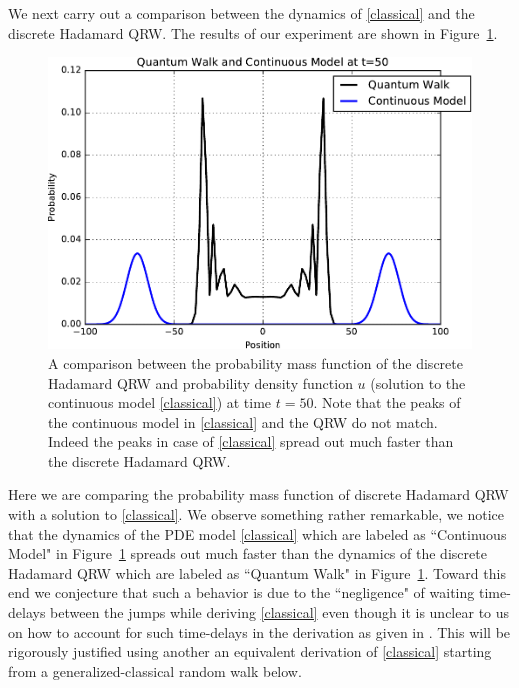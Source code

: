 \documentclass{siamart1116}
\begin{document}
We next carry out a comparison between the dynamics of \eqref{classical} and the 
discrete Hadamard QRW. The results of our experiment are shown in Figure~\ref{regplot}.
%
\begin{figure}[h!]
\centering
\includegraphics[width=.5\linewidth]{goldwateressay_fig2}
\caption{\footnotesize{A comparison between the probability mass function of the discrete 
Hadamard QRW and probability density function $u$ (solution to the continuous model 
\eqref{classical}) at time $t=50$. Note that the peaks of the continuous model in 
\eqref{classical} and the QRW do not match. Indeed the peaks in case of 
\eqref{classical} spread out much faster than the discrete Hadamard QRW.}}
\label{regplot}
\end{figure}
%
Here we are comparing the probability mass function of discrete Hadamard QRW with a solution to 
\eqref{classical}. 
We observe something rather remarkable, we notice that the dynamics of the PDE model 
\eqref{classical} which are labeled as ``Continuous Model" in Figure~\ref{regplot}
spreads out much faster than the dynamics of the discrete Hadamard QRW which are 
labeled as ``Quantum Walk" in Figure~\ref{regplot}. Toward this end we conjecture that 
such a behavior is due to the ``negligence" of waiting time-delays between the jumps while 
deriving \eqref{classical} even though it is unclear to us on how to account for such time-delays 
in the derivation as given in \cite{blanchard}. This will be rigorously justified using 
another an equivalent derivation of \eqref{classical} starting from a generalized-classical
random walk below. 
\end{document}
